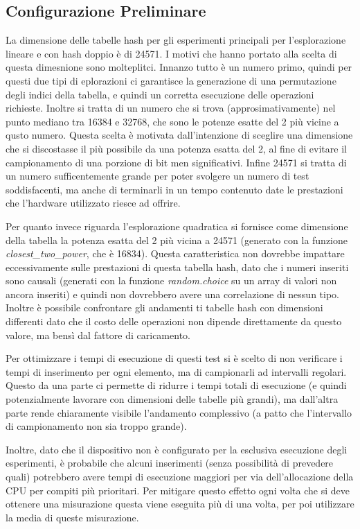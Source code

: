 \documentclass{article}
\begin{document}
\subsection{Configurazione Preliminare}

La dimensione delle tabelle hash per gli esperimenti principali per l'esplorazione lineare e con hash doppio è di 24571. I motivi che hanno portato alla scelta di questa dimesnione sono molteplitci. Innanzo tutto è un numero primo, quindi per questi due tipi di eplorazioni ci garantisce la generazione di una permutazione degli indici della tabella, e quindi un corretta esecuzione delle operazioni richieste. Inoltre si tratta di un numero che si trova (approsimativamente) nel punto mediano tra 16384 e 32768, che sono le potenze esatte del 2 più vicine a qusto numero. Questa scelta è motivata dall'intenzione di sceglire una dimensione che si discostasse il più possibile da una potenza esatta del 2, al fine di evitare il campionamento di una porzione di bit men significativi. Infine 24571 si tratta di un numero sufficentemente grande per poter svolgere un numero di test soddisfacenti, ma anche di terminarli in un tempo contenuto date le prestazioni che l'hardware utilizzato riesce ad offrire.

Per quanto invece riguarda l'esplorazione quadratica si fornisce come dimensione della tabella la potenza esatta del 2 più vicina a 24571 (generato con la funzione \emph{closest\_two\_power}, che è 16834). Questa caratteristica non dovrebbe impattare eccessivamente sulle prestazioni di questa tabella hash, dato che i numeri inseriti sono causali (generati con la funzione \emph{random.choice} su un array di valori non ancora inseriti) e quindi non dovrebbero avere una correlazione di nessun tipo. Inoltre è possibile confrontare gli andamenti ti tabelle hash con dimensioni differenti dato che il costo delle operazioni non dipende direttamente da questo valore, ma bensì dal fattore di caricamento.

Per ottimizzare i tempi di esecuzione di questi test si è scelto di non verificare i tempi di inserimento per ogni elemento, ma di campionarli ad intervalli regolari. Questo da una parte ci permette di ridurre i tempi totali di esecuzione (e quindi potenzialmente lavorare con dimensioni delle tabelle più grandi), ma dall'altra parte rende chiaramente visibile l'andamento complessivo (a patto che l'intervallo di campionamento non sia troppo grande).

Inoltre, dato che il dispositivo non è configurato per la esclusiva esecuzione degli esperimenti, è probabile che alcuni inserimenti (senza possibilità di prevedere quali) potrebbero avere tempi di esecuzione maggiori per via dell'allocazione della CPU per compiti più prioritari. Per mitigare questo effetto ogni volta che si deve ottenere una misurazione questa viene eseguita più di una volta, per poi utilizzare la media di queste misurazione.
\end{document}

